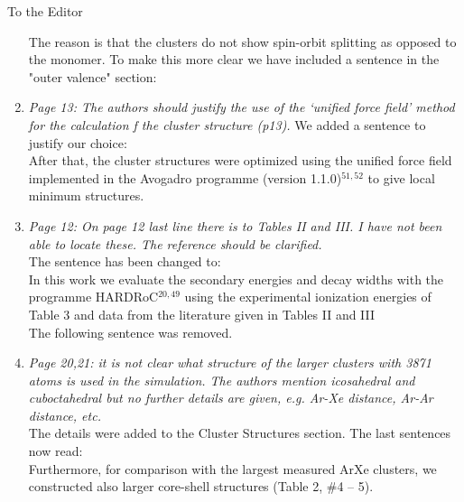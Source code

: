 \documentclass[DIN,pagenumber=false,parskip=half,fromalign=left,fromphone=true,fromemail=true,fromurl=false,fromlogo=false,fromrule=false]{scrlttr2}
\begin{document}
\begin{letter}{To the Editor}
\begin{enumerate}
The reason is that the clusters do not show spin-orbit splitting as opposed to the monomer. To make this more clear we have included a sentence in the "outer valence" section: {}

 \item \emph{Page 13:
       The authors should justify the use of the ‘unified force field’ method for the calculation f the cluster structure (p13).}
       We added a sentence to justify our choice:\\
       After that, the cluster structures were optimized using the unified
       force field implemented in the Avogadro programme
       (version 1.1.0)$^{51,52}$ to give local minimum structures.
       {\color{blue}{ The method
       was chosen due to its low computational cost, the possibility to find
       the next local minimum structure based on the chosen starting point
       and the necessary effort to produce reliable results with density
       functional theory (DFT) for v. d. Waals interactions since we in
       this work discuss structural trends and not absolute structures.}}

 \item \emph{Page 12:
       On page 12 last line there is to Tables II and III. I have not been able to locate these. The reference should be clarified.}\\
       The sentence has been changed to:\\
       In this work we evaluate the secondary energies and decay widths with
       the programme HARDRoC$^{20,49}$ using the experimental ionization energies
       of Table 3 and data from the literature given in Tables II and III
       {\color{blue}{of Ref. 34.}}\\
       The following sentence was removed.

 \item \emph{Page 20,21:
       it is not clear what structure of the larger clusters with 3871 atoms is used in the simulation. The authors mention icosahedral and cuboctahedral but no further details are given, e.g. Ar-Xe distance, Ar-Ar distance, etc.}\\
       The details were added to the Cluster Structures section. The last
       sentences now read:\\
       Furthermore, for comparison with the largest measured ArXe clusters,
       we constructed also larger core-shell structures (Table 2, \#4 – 5).
       {}


\end{enumerate}
\end{letter}
\end{document}
